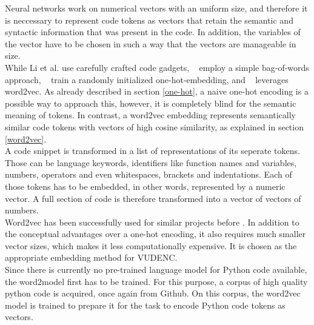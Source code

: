 \documentclass[
	a4paper,
	pagesize,
	pdftex,
	12pt,
	twoside, %
	BCOR=5mm, %
	ngerman,
	fleqn,
	final,
	]{scrartcl}
\begin{document}
Neural networks work on numerical vectors with an uniform size, and therefore it is neccessary to represent code tokens as vectors that retain the semantic and syntactic information that was present in the code. In addition, the variables of the vector have to be chosen in such a way that the vectors are manageable in size.\\
While Li et al.\cite{Li.2018} use carefully crafted code gadgets, ~\cite{Hovsepyan.2012} employ a simple bag-of-words approach, ~\cite{Russell.2018} train a randomly initialized one-hot-embedding, and ~\cite{Liu.2018} leverages word2vec. As already described in section \ref{one-hot}, a naive one-hot encoding is a possible way to approach this, however, it is completely blind for the semantic meaning of tokens. In contrast, a word2vec embedding represents semantically similar code tokens with vectors of high cosine similarity, as explained in section \ref{word2vec}.\\
A code snippet is transformed in a list of representations of its seperate tokens. Those can be language keywords, identifiers like function names and variables, numbers, operators and even whitespaces, brackets and indentations. Each of those tokens has to be embedded, in other words, represented by a numeric vector. A full section of code is therefore transformed into a vector of vectors of numbers.\\
Word2vec has been successfully used for similar projects before \cite{Liu.2018}. In addition to the conceptual advantages over a one-hot encoding, it also requires much smaller vector sizes, which makes it less computationally expensive. It is chosen as the appropriate embedding method for VUDENC.\\
Since there is currently no pre-trained language model for Python code available, the word2model first has to be trained. For this purpose, a corpus of high quality python code is acquired, once again from Github. On this corpus, the word2vec model is trained to prepare it for the task to encode Python code tokens as vectors.
\end{document}
